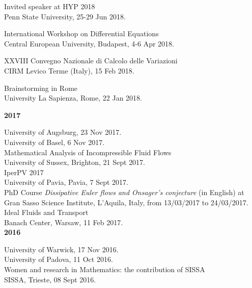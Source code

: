 \documentclass[10pt]{article}
\newcommand{\blankline}{\quad\pagebreak[2]}
\begin{document}
Invited speaker at HYP 2018\\
Penn State University, 25-29 Jun 2018.\\
\blankline


International Workshop on Differential Equations\\
Central European University, Budapest, 4-6 Apr 2018.\\
\blankline


XXVIII Convegno Nazionale di Calcolo delle Variazioni\\
CIRM Levico Terme (Italy), 15 Feb 2018.\\
\blankline


Brainstorming in Rome\\
University La Sapienza, Rome, 22 Jan 2018.\\
\blankline


\textbf{2017}\\
\blankline

University of Augsburg, 23 Nov 2017. \\


University of Basel, 6 Nov 2017. \\

Mathematical Analysis of Incompressible Fluid Flows\\
University of Sussex, Brighton, 21 Sept 2017.\\


IperPV 2017\\
University of Pavia, Pavia, 7 Sept 2017.\\



PhD Course \emph{Dissipative Euler flows and Onsager's conjecture} (in English) at Gran Sasso Science Institute, L'Aquila, Italy, from 13/03/2017 to 24/03/2017.\\

Ideal Fluids and Transport\\
Banach Center, Warsaw, 11 Feb 2017.\\




\textbf{2016}\\
\blankline

University of Warwick, 17 Nov 2016.\\

University of Padova, 11 Oct 2016.\\

Women and research in Mathematics: the contribution of SISSA\\
SISSA, Trieste, 08 Sept 2016.\\
\end{document}
